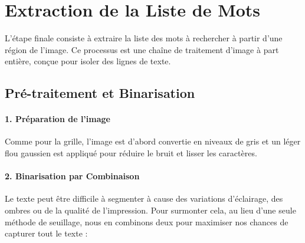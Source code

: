 \documentclass{article}
\begin{document}
\section{Extraction de la Liste de Mots}
L'étape finale consiste à extraire la liste des mots à rechercher à partir d'une région de l'image. Ce processus est une chaîne de traitement d'image à part entière, conçue pour isoler des lignes de texte.

\subsection{Pré-traitement et Binarisation}
\paragraph{1. Préparation de l'image}
Comme pour la grille, l'image est d'abord convertie en niveaux de gris et un léger flou gaussien est appliqué pour réduire le bruit et lisser les caractères.

\paragraph{2. Binarisation par Combinaison}
Le texte peut être difficile à segmenter à cause des variations d'éclairage, des ombres ou de la qualité de l'impression. Pour surmonter cela, au lieu d'une seule méthode de seuillage, nous en combinons deux pour maximiser nos chances de capturer tout le texte :
\end{document}
